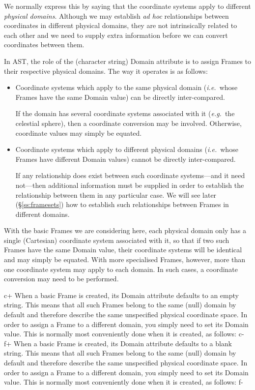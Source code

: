 \documentclass[twoside,11pt]{starlink}
\providecommand{\secref}[1]{\S\ref{#1}}
\begin{document}
We normally express this by saying that the coordinate systems apply
to different \emph{physical domains}. Although we may establish
\emph{ad hoc} relationships between coordinates in different physical
domains, they are not intrinsically related to each other and we need
to supply extra information before we can convert coordinates between
them.

In AST, the role of the (character string) Domain attribute is to
assign Frames to their respective physical domains. The way it
operates is as follows:

\begin{itemize}
\item Coordinate systems which apply to the same physical domain
(\emph{i.e.}\ whose Frames have the same Domain value) can be directly
inter-compared.

If the domain has several coordinate systems associated with it
(\emph{e.g.}\ the celestial sphere), then a coordinate conversion may
be involved. Otherwise, coordinate values may simply be equated.

\item Coordinate systems which apply to different physical domains
(\emph{i.e.}\ whose Frames have different Domain values) cannot be
directly inter-compared.

If any relationship does exist between such coordinate systems---and
it need not---then additional information must be supplied in order to
establish the relationship between them in any particular case. We
will see later (\secref{ss:framesets}) how to establish such
relationships between Frames in different domains.
\end{itemize}

With the basic Frames we are considering here, each physical domain only
has a single (Cartesian) coordinate system associated with it, so that if
two such Frames have the same Domain value, their coordinate systems will
be identical and may simply be equated. With more specialised Frames,
however, more than one coordinate system may apply to each domain. In
such cases, a coordinate conversion may need to be performed.

c+
When a basic Frame is created, its Domain attribute defaults to an
empty string. This means that all such Frames belong to the same
(null) domain by default and therefore describe the same unspecified
physical coordinate space. In order to assign a Frame to a different
domain, you simply need to set its Domain value. This is normally most
conveniently done when it is created, as follows:
c-
f+
When a basic Frame is created, its Domain attribute defaults to a
blank string. This means that all such Frames belong to the same
(null) domain by default and therefore describe the same unspecified
physical coordinate space. In order to assign a Frame to a different
domain, you simply need to set its Domain value. This is normally most
conveniently done when it is created, as follows:
f-
\end{document}
